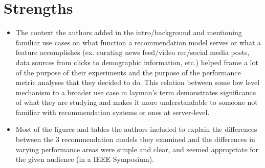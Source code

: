 \documentclass [12pt]{article}
\begin{document}
    \section{Strengths} %
    \label{sec:strengths}
        \begin{itemize}
            \item The context the authors added in the intro/background and mentioning familiar use cases on what function a recommendation model serves or what a feature accomplishes (ex. curating news feed/video rec/social media posts, data sources from clicks to demographic information, etc.) helped frame a lot of the purpose of their experiments and the purpose of the performance metric analyses that they decided to do. This relation between some low level mechanism to a broader use case in layman's term demonstrates significance of what they are studying and makes it more understandable to someone not familiar with recommendation systems or ones at server-level. 

            \item Most of the figures and tables the authors included to explain the differences between the 3 recommendation models they examined and the differences in varying performance areas were simple and clear, and seemed appropriate for the given audience (in a IEEE Symposium).
            

        \end{itemize}
\end{document}

